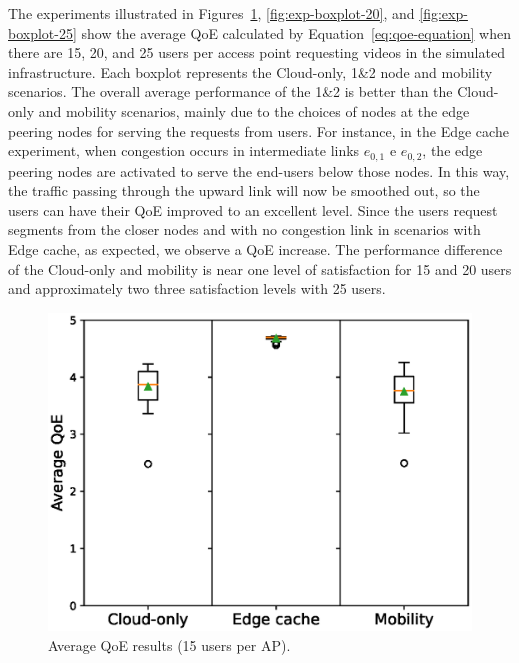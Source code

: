 The experiments illustrated in Figures~\ref{fig:exp-boxplot-15}, \ref{fig:exp-boxplot-20}, and \ref{fig:exp-boxplot-25} show the average QoE calculated by Equation~\ref{eq:qoe-equation} when there are 15, 20, and 25 users per access point requesting videos in the simulated infrastructure. Each boxplot represents the Cloud-only, 1\&2 node and mobility scenarios. The overall average performance of the 1\&2 is better than the Cloud-only and mobility scenarios, mainly due to the choices of nodes at the edge peering nodes for serving the requests from users. 
%
For instance, in the Edge cache experiment, when congestion occurs in intermediate links $e_{0,1}$ e $e_{0,2}$, the edge peering nodes are activated to serve the end-users below those nodes. In this way, the traffic passing through the upward link will now be smoothed out, so the users can have their QoE improved to an excellent level.
%
Since the users request segments from the closer nodes and with no congestion link in scenarios with Edge cache, as expected, we observe a QoE increase. %
%
The performance difference of the Cloud-only and mobility is near one level of satisfaction for 15 and 20 users and approximately two three satisfaction levels with 25 users.


\begin{figure}[!htb]
    \centering
    \includegraphics[width=\linewidth]{images/QoEBoxplot-15u-2.eps}
    \vspace{-0.6cm}
    \caption{Average QoE results (15 users per AP).}
    \label{fig:exp-boxplot-15}
\end{figure}

